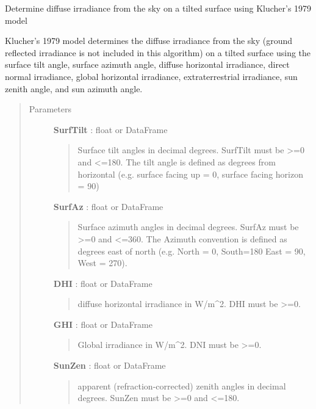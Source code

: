 \documentclass[letterpaper,10pt,english]{sphinxmanual}
\begin{document}
\begin{fulllineitems}
\label{stubs/pvlib.pvl_klucher1979:pvlib.pvl_klucher1979}
Determine diffuse irradiance from the sky on a tilted surface using Klucher's 1979 model

Klucher's 1979 model determines the diffuse irradiance from the sky
(ground reflected irradiance is not included in this algorithm) on a
tilted surface using the surface tilt angle, surface azimuth angle,
diffuse horizontal irradiance, direct normal irradiance, global
horizontal irradiance, extraterrestrial irradiance, sun zenith angle,
and sun azimuth angle.
\begin{quote}\begin{description}
\item[{Parameters}] \leavevmode
\textbf{SurfTilt} : float or DataFrame
\begin{quote}

Surface tilt angles in decimal degrees.
SurfTilt must be \textgreater{}=0 and \textless{}=180. The tilt angle is defined as
degrees from horizontal (e.g. surface facing up = 0, surface facing
horizon = 90)
\end{quote}

\textbf{SurfAz} : float or DataFrame
\begin{quote}

Surface azimuth angles in decimal degrees.
SurfAz must be \textgreater{}=0 and \textless{}=360. The Azimuth convention is defined
as degrees east of north (e.g. North = 0, South=180 East = 90, West = 270).
\end{quote}

\textbf{DHI} : float or DataFrame
\begin{quote}

diffuse horizontal irradiance in W/m\textasciicircum{}2. 
DHI must be \textgreater{}=0.
\end{quote}

\textbf{GHI} : float or DataFrame
\begin{quote}

Global  irradiance in W/m\textasciicircum{}2. 
DNI must be \textgreater{}=0.
\end{quote}

\textbf{SunZen} : float or DataFrame
\begin{quote}

apparent (refraction-corrected) zenith
angles in decimal degrees. 
SunZen must be \textgreater{}=0 and \textless{}=180.
\end{quote}


\end{description}
\end{quote}
\end{fulllineitems}
\end{document}
